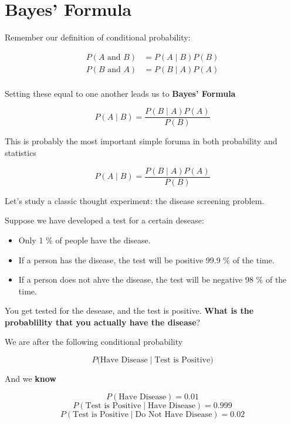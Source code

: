 \section{Bayes' Formula}

%
\begin{frame}
Remember our definition of conditional probability:

\begin{align*}
P(A \text{ and } B) &= P(A \mid B) P(B) \\
P(B \text{ and } A) &= P(B \mid A) P(A) \\
\end{align*}

Setting these equal to one another leads us to \textbf{Bayes' Formula}

$$ P(A \mid B) = \frac{ P(B \mid A) P(A) }{ P(B) } $$

\end{frame}
%

%
\begin{frame}

This is probably the most important simple foruma in both probability and
statistics

$$ P(A \mid B) = \frac{ P(B \mid A) P(A) }{ P(B) } $$

\end{frame}
%

%
\begin{frame}

Let's study a classic thought experiment: the disease screening problem.

Suppose we have developed a test for a certain desease:
\begin{itemize}
\item Only 1 \% of people have the disease.
\item If a person has the disease, the test will be positive 99.9 \% of the
time.
\item If a person does not ahve the disease, the test will be negative 98 \% of
the time.
\end{itemize}

You get tested for the desease, and the test is positive.  \textbf{What is the
probablility that you actually have the disease}?

\end{frame}
%

%
\begin{frame}
We are after the following conditional probability

$$ P(\text{Have Disease} \mid \text{Test is Positive)} $$

And we \textbf{know}

$$ P(\text{Have Disease}) = 0.01 $$
$$ P(\text{Test is Positive} \mid \text{Have Disease}) = 0.999 $$
$$ P(\text{Test is Positive} \mid \text{Do Not Have Disease}) = 0.02 $$
\end{frame}
%

